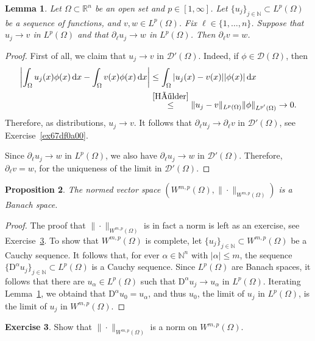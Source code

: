 \documentclass[a4paper,9pt]{amsart}
\newcommand{\scr}[1]{\mathscr{#1}}
\newcommand{\N}{\mathbb{N}}	%
\newcommand{\R}{\mathbb{R}}	%
\newcommand{\did}{\,\mathrm{d}}	%
\newcommand{\de}{\partial}		%
\newcommand{\Diff}{\mathrm{D}}
\theoremstyle{plain}
\newtheorem{proposition}{Proposition}[section]
\newtheorem{lemma}[proposition]{Lemma}
\theoremstyle{definition}
\newtheorem{exercise}[proposition]{Exercise}%
\theoremstyle{remark}
\begin{document}
\begin{lemma}\label{lem680b2dfd}
	Let $\Omega\subset\R^n$ be an open set and $p\in[1,\infty]$.
	Let $\{u_j\}_{j\in\N}\subset L^p(\Omega)$ be a sequence of functions, and $v,w\in L^p(\Omega)$.
	Fix $\ell\in\{1,\dots,n\}$.
	Suppose that $u_j\to v$ in $L^p(\Omega)$ and that $\de_\ell u_j\to w$ in $L^p(\Omega)$.
	Then $\de_\ell v = w$. 
\end{lemma}
\begin{proof}
	First of all, we claim that $u_j\to v$ in $\scr D'(\Omega)$.
	Indeed, if $\phi\in\scr D(\Omega)$, then
	\begin{align*}
	 	\left| \int_\Omega u_j(x) \phi(x) \did x - \int_\Omega v(x)\phi(x) \did x \right|
		&\le \int_\Omega |u_j(x)-v(x)| |\phi(x)| \did x \\
		&\overset{\eqref{Hölder}}\le \|u_j-v\|_{L^p(\Omega)} \|\phi\|_{L^{p'}(\Omega)}
		\rightarrow 0 .
	\end{align*}
	Therefore, as distributions, $u_j\to v$.
	It follows that $\de_\ell u_j\to \de_\ell v$ in $\scr D'(\Omega)$, see Exercise~\ref{ex67df0a00}.
	
	Since $\de_\ell u_j\to w$ in $L^p(\Omega)$, we also have $\de_\ell u_j\to w$ in $\scr D'(\Omega)$.
	Therefore, $\de_\ell v = w$, for the uniqueness of the limit in $\scr D'(\Omega)$.
\end{proof}

\begin{proposition}
	The normed vector space $( W^{m,p}(\Omega) , \|\cdot\|_{W^{m,p}(\Omega)} )$ is a Banach space.
\end{proposition}
\begin{proof}
	The proof that $\|\cdot\|_{W^{m,p}(\Omega)}$ is in fact a norm is left as an exercise, see Exercise~\ref{ex680b2d5c}.
	To show that $W^{m,p}(\Omega)$ is complete, let $\{u_j\}_{j\in\N}\subset W^{m,p}(\Omega)$ be a Cauchy sequence.
	It follows that, for ever $\alpha\in\N^n$ with $|\alpha|\le m$, the sequence $\{\Diff^\alpha u_j\}_{j\in\N}\subset L^p(\Omega)$ is a Cauchy sequence.
	Since $L^p(\Omega)$ are Banach spaces, it follows that there are $u_\alpha\in L^p(\Omega)$ such that $\Diff^\alpha u_j\to u_\alpha$ in $L^p(\Omega)$.
	Iterating Lemma~\ref{lem680b2dfd}, we obtaind that $\Diff^\alpha u_0 = u_\alpha$,
	and thus $u_0$, the limit of $u_j$ in $L^p(\Omega)$, is the limit of $u_j$ in $W^{m,p}(\Omega)$.
\end{proof}

\begin{exercise}\label{ex680b2d5c}
	Show that $\|\cdot\|_{W^{m,p}(\Omega)}$ is a norm on $W^{m,p}(\Omega)$.
\end{exercise}
\end{document}
